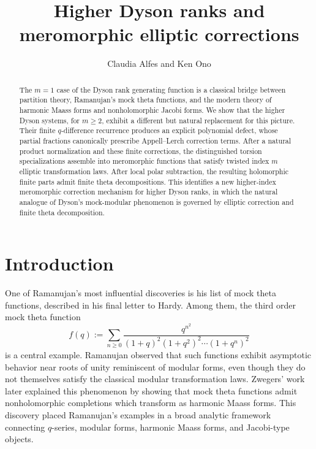 \documentclass[12pt]{amsart}
\title{Higher Dyson ranks and meromorphic elliptic corrections}
\author{Claudia Alfes and  Ken Ono}
\date{}
\numberwithin{equation}{section}
\begin{document}
\begin{abstract} The \(m=1\) case of the Dyson rank generating function is a classical bridge
between partition theory, Ramanujan's mock theta functions, and the modern
theory of harmonic Maass forms and nonholomorphic Jacobi forms. We show that
the higher Dyson systems, for \(m\geq 2\), exhibit a different but natural
replacement for this picture. Their finite \(q\)-difference recurrence produces
an explicit polynomial defect, whose partial fractions canonically prescribe
Appell--Lerch correction terms. After a natural product normalization and these
finite corrections, the distinguished torsion specializations assemble into
meromorphic functions that satisfy twisted index \(m\) elliptic transformation
laws. After local polar subtraction, the resulting holomorphic finite parts admit
finite theta decompositions. 
This identifies a new higher-index meromorphic correction mechanism for higher Dyson ranks, in which the natural analogue of Dyson's mock-modular phenomenon is governed by elliptic correction and finite theta decomposition.
\end{abstract}

\maketitle

\section{Introduction}
One of Ramanujan's most influential discoveries is his list of mock theta functions, described in his final letter to Hardy.  Among them, the third order mock theta function
\[
f(q):=\sum_{n\geq 0}\frac{q^{n^2}}{(1+q)^2(1+q^2)^2\cdots (1+q^n)^2}
\]
is a central example.  Ramanujan observed that such functions exhibit asymptotic behavior near roots of unity reminiscent of modular forms, even though they do not themselves satisfy the classical modular transformation laws.  Zwegers' work later explained this phenomenon by showing that mock theta functions admit nonholomorphic completions which transform as harmonic Maass forms.  This discovery placed Ramanujan's examples in a broad analytic framework connecting $q$-series, modular forms, harmonic Maass forms, and Jacobi-type objects.
\end{document}
